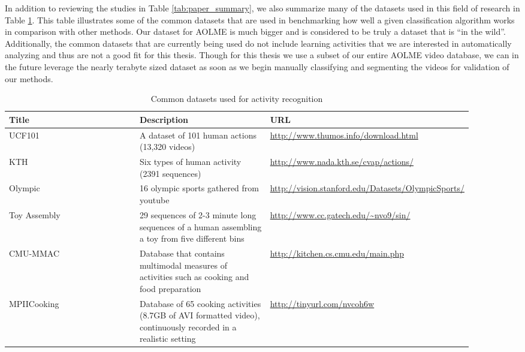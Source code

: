 In addition to reviewing the studies in Table \ref{tab:paper_summary},  we also
summarize many of the datasets used in this field of research in Table
\ref{tab:common_datasets}. This table illustrates some of the common datasets
that are used in benchmarking how well a given classification algorithm works in
comparison with other methods. Our dataset for AOLME is much bigger and is
considered to be truly a dataset that is ``in the wild''. Additionally, the
common datasets that are currently being used do not include learning activities
that we are interested in automatically analyzing and thus are not a good fit
for this thesis. Though for this thesis we  use a subset of our entire AOLME
video database, we can in the future leverage the nearly terabyte sized dataset
as soon as we begin manually classifying and segmenting the videos for
validation of our methods.

\begin{singlespace}
  \begin{table}[h]
  \begin{centering}
    \begin{tabular}{ | p{0.3\linewidth} | p{0.3\linewidth} | p{0.3\linewidth} |  }
      \hline
      \textbf{Title} & \textbf{Description} & \textbf{URL} \\
      \hline
      UCF101 \cite{soomro2012ucf101}& A dataset of 101 human actions (13,320 videos) &
      \url{http://www.thumos.info/download.html} \\
      \hline
      KTH & Six types of human activity (2391 sequences) & \url{http://www.nada.kth.se/cvap/actions/} \\
      \hline
      Olympic \cite{niebles2010modeling} & 16 olympic sports gathered from youtube &
       \url{http://vision.stanford.edu/Datasets/OlympicSports/} \\
      \hline
      Toy Assembly \cite{vo2014stochastic} & 29 sequences of 2-3 minute long sequences
      of a human assembling a toy from five different bins & \url{http://www.cc.gatech.edu/~nvo9/sin/} \\
      \hline
      CMU-MMAC \cite{spriggs2009temporal} & Database that contains multimodal measures of activities such as
      cooking and food preparation & \url{http://kitchen.cs.cmu.edu/main.php} \\
      \hline
      MPIICooking \cite{rohrbach2012database} & Database of 65 cooking activities (8.7GB of AVI formatted video),
      continuously recorded in a realistic setting & \url{http://tinyurl.com/nvcoh6w} \\
      \hline
    \end{tabular}
    \caption{Common datasets used for activity recognition}
    \label{tab:common_datasets}
  \end{centering}
\end{table}
\end{singlespace}

